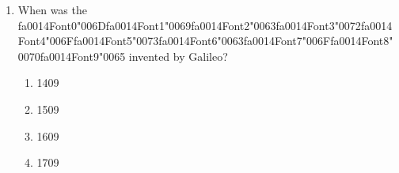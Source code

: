 \documentclass[12pt]{article}
\begin{document}
\begin{enumerate}[label=\arabic*.]
\begin{enumerate}[label=(\alph*)]
    \item 1.5 x 1017 meters
\end{enumerate}
\item When was the {\csname fa0014Font0\endcsname\char"006D}{\csname fa0014Font1\endcsname\char"0069}{\csname fa0014Font2\endcsname\char"0063}{\csname fa0014Font3\endcsname\char"0072}{\csname fa0014Font4\endcsname\char"006F}{\csname fa0014Font5\endcsname\char"0073}{\csname fa0014Font6\endcsname\char"0063}{\csname fa0014Font7\endcsname\char"006F}{\csname fa0014Font8\endcsname\char"0070}{\csname fa0014Font9\endcsname\char"0065} invented by Galileo?
\begin{enumerate}[label=(\alph*)]
    \item 1409
    \item 1509
    \item 1609
    \item 1709
\end{enumerate}
\end{enumerate}
\end{document}
